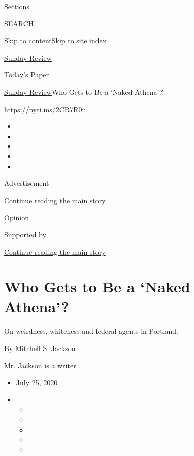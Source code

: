 Sections

SEARCH

\protect\hyperlink{site-content}{Skip to
content}\protect\hyperlink{site-index}{Skip to site index}

\href{https://www.nytimes3xbfgragh.onion/section/opinion/sunday}{Sunday
Review}

\href{https://myaccount.nytimes3xbfgragh.onion/auth/login?response_type=cookie\&client_id=vi}{}

\href{https://www.nytimes3xbfgragh.onion/section/todayspaper}{Today's
Paper}

\href{/section/opinion/sunday}{Sunday Review}\textbar{}Who Gets to Be a
`Naked Athena'?

\url{https://nyti.ms/2CR7R0n}

\begin{itemize}
\item
\item
\item
\item
\item
\end{itemize}

Advertisement

\protect\hyperlink{after-top}{Continue reading the main story}

\href{/section/opinion}{Opinion}

Supported by

\protect\hyperlink{after-sponsor}{Continue reading the main story}

\hypertarget{who-gets-to-be-a-naked-athena}{%
\section{Who Gets to Be a `Naked
Athena'?}\label{who-gets-to-be-a-naked-athena}}

On weirdness, whiteness and federal agents in Portland.

By Mitchell S. Jackson

Mr. Jackson is a writer.

\begin{itemize}
\item
  July 25, 2020
\item
  \begin{itemize}
  \item
  \item
  \item
  \item
  \item
  \end{itemize}
\end{itemize}

